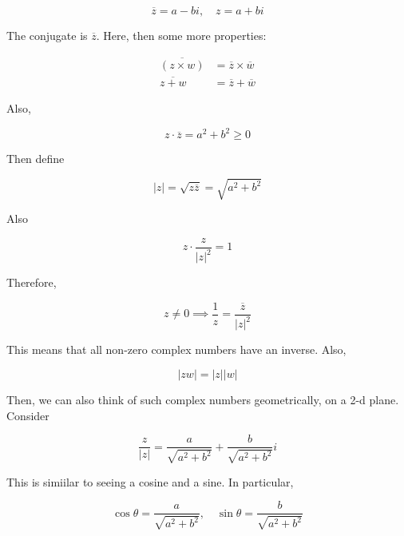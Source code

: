 \documentclass{article}
\newtheorem{one minute paper}[theorem]{One Minute Paper}
\begin{document}
\begin{equation}
    \overline{z} = a - bi, \quad z = a + bi
\end{equation}

The conjugate is $\overline{z}$. Here, then some more properties:

\begin{align}
    \overline{(z\times w)} &= \overline{z} \times \overline{w} \\
    \overline{z + w} &= \overline{z} + \overline{w}
\end{align}

Also, 

\begin{equation}
    z \cdot \overline{z} = a^2 + b^2 \geq 0
\end{equation}

Then define 

\begin{equation}
    |z| = \sqrt{z \overline{z}} = \sqrt{a^2 + b^2}
\end{equation}

Also 

\begin{equation}
    z \cdot \frac{z}{|z|^2} = 1
\end{equation}

Therefore,

\begin{equation}
    z \neq 0 \implies \frac{1}{z} = \frac{\overline{z}}{|z|^2}
\end{equation}

This means that all non-zero complex numbers have an inverse. Also, 

\begin{equation}
    |zw| = |z| |w|
\end{equation}

Then, we can also think of such complex numbers geometrically, on a 2-d plane. Consider 

\begin{equation}
    \frac{z}{|z|} = \frac{a}{\sqrt{a^2 + b^2}} + \frac{b}{\sqrt{a^2 + b^2}}i
\end{equation}

This is simiilar to seeing a cosine and a sine. In particular, 

\begin{equation}
    \cos\theta = \frac{a}{\sqrt{a^2 + b^2}}, \quad \sin\theta = \frac{b}{\sqrt{a^2 + b^2}}
\end{equation}
\end{document}
